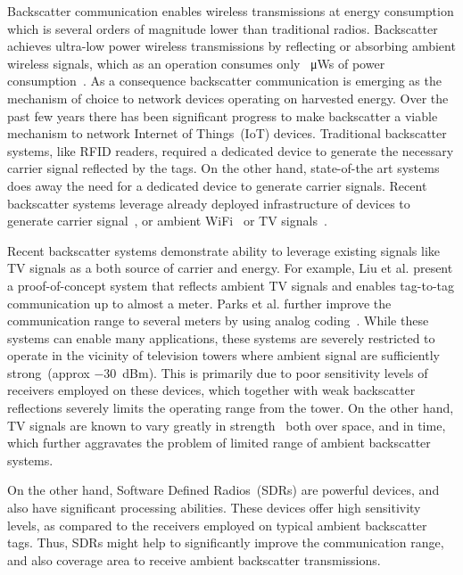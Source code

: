 Backscatter communication enables wireless transmissions
at energy consumption which is several orders of magnitude
lower than traditional radios. Backscatter achieves ultra-low
power wireless transmissions by reflecting or absorbing ambient
wireless signals, which as an operation consumes only 
\SI{}{\micro\watt}s of power consumption~\cite{liu_ambient_2013}. 
As a consequence backscatter
communication is emerging as the mechanism of choice to network
devices operating on harvested energy.  
Over the past few years there has been significant progress
to make backscatter a viable mechanism to network Internet of
Things~(IoT) devices. Traditional backscatter systems, like RFID readers, required a
dedicated device to generate the necessary carrier signal
reflected by the tags. On the other hand, state-of-the art systems 
does away the need for a dedicated device to generate carrier signals. 
Recent backscatter systems leverage already deployed infrastructure of
devices to generate carrier signal~\cite{varshney2016lorea,iyer2016inter}, or ambient WiFi~\cite{hitchhike,kellogg2015wi} or TV
signals~\cite{liu_ambient_2013,parks_turbocharging_2014}.

Recent backscatter systems demonstrate ability to leverage
existing signals like TV signals as a both source of carrier and energy. For
example, Liu et al. present a proof-of-concept system that reflects
ambient TV signals and enables tag-to-tag communication up to almost a
meter. Parks et al. further improve the communication range to several
meters by using analog coding~\cite{parks_turbocharging_2014}. While
these systems can enable many applications, these systems are severely restricted
to operate in the vicinity of television towers where ambient signal
are sufficiently strong~(approx
\SI{-30}{dBm}). This is primarily due to poor sensitivity levels of receivers
employed on these devices, which together with weak backscatter reflections 
severely limits the operating range from the tower.
On the other hand, TV signals are known to vary greatly in
strength~\cite{wang_fm_2017} both over space, and in time,  which further aggravates the
problem of limited range of ambient backscatter systems.

On the other hand, Software Defined Radios~(SDRs) are powerful devices, and also
have significant processing abilities. These devices offer high
sensitivity levels, as compared to the receivers employed on typical 
ambient backscatter tags. Thus, SDRs might help to
significantly improve the communication range, and also coverage 
area to receive ambient backscatter transmissions. 

